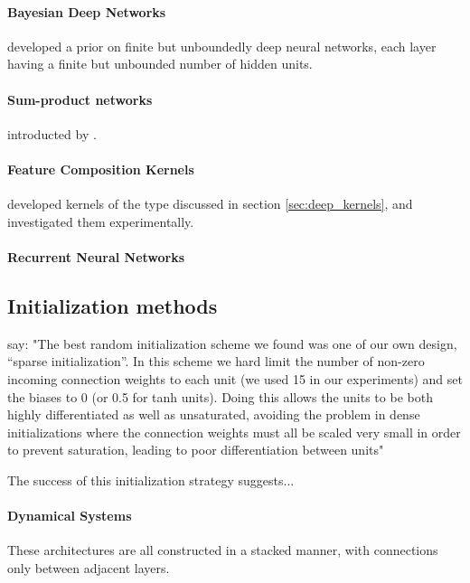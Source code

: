 \documentclass{article}
\begin{document}
\paragraph{Bayesian Deep Networks} \cite{adams2010learning} developed a prior on finite but unboundedly deep neural networks, each layer having a finite but unbounded number of hidden units.

\paragraph{Sum-product networks} introducted by \cite{poon2011sum}.

\paragraph{Feature Composition Kernels} \cite{cho2012kernel} developed kernels of the type discussed in section \ref{sec:deep_kernels}, and investigated them experimentally.

\paragraph{Recurrent Neural Networks}
\cite{pascanu2012understanding}



\subsection{Initialization methods}

\cite{martens2010deep} say:  "The best random initialization scheme we found was one of our own design,
“sparse initialization”. In this scheme we hard limit the
number of non-zero incoming connection weights to each
unit (we used 15 in our experiments) and set the biases to
0 (or 0.5 for tanh units). Doing this allows the units to be
both highly differentiated as well as unsaturated, avoiding
the problem in dense initializations where the connection
weights must all be scaled very small in order to prevent
saturation, leading to poor differentiation between units"

The success of this initialization strategy suggests...

\paragraph{Dynamical Systems}
These architectures are all constructed in a stacked manner, with connections only between adjacent layers.
\end{document}
